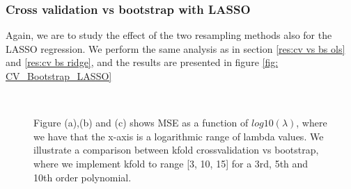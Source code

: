 \documentclass[../main.tex]{subfiles}
\begin{document}
\begin{flushleft}
\subsubsection{Cross validation vs bootstrap with LASSO}
Again, we are to study the effect of the two resampling methods also for the LASSO regression. We perform the same analysis as in section \eqref{res:cv vs bs ols} and \eqref{res:cv bs ridge}, and the results are presented in figure \eqref{fig: CV_Bootstrap_LASSO}
\begin{figure}[H]
\hspace*{-0.6in}
\\
\hspace*{0.9in}
\caption{Figure (a),(b) and (c) shows MSE as a function of $log10(\lambda)$, where we have that the x-axis is a logarithmic range of lambda values. We illustrate a comparison between kfold crossvalidation vs bootstrap, where we implement kfold to range [3, 10, 15] for a 3rd, 5th and 10th order polynomial.}
\label{fig: CV_Bootstrap_LASSO}
\end{figure}


\end{flushleft}
\end{document}
